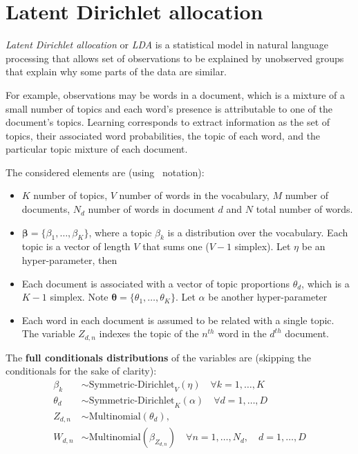 \section{Latent Dirichlet allocation}

\emph{Latent Dirichlet allocation} or \emph{LDA} is a statistical model in natural language processing that allows set of observations to be explained by unobserved groups that explain why some parts of the data are similar.

For example, observations may be words in a document, which is a mixture of a small number of topics and each word's presence is attributable to one of the document's topics. Learning corresponds to extract information as the set of topics, their associated word probabilities, the topic of each word, and the particular topic mixture of each document.

The considered elements are (using~\cite{hoffman2013stochastic} notation):
\begin{itemize}\setlength\itemsep{1em}
  \item \(K\) number of topics, \(V\) number of words in the vocabulary, \(M\) number of documents, \(N_{d}\) number of words in document \(d\) and \(N\) total number of words.
  \item \(\bm{\beta} = \{\beta_{1}, \dots, \beta_{K}\}\), where a topic \(\beta_{k}\) is a distribution over the vocabulary. Each topic is a vector of length \(V\) that sums one (\(V-1\) simplex). Let \(\eta\) be an hyper-parameter, then

  \item Each document is associated with a vector of topic proportions \(\theta_{d}\), which is a \(K-1\) simplex. Note \(\bm{\theta} = \{\theta_{1},\dots,\theta_{K}\}\).  Let \(\alpha\) be another hyper-parameter
  \item Each word in each document is assumed to be related with a single topic. The variable \(Z_{d,n}\) indexes the topic of the \(n^{th}\) word in the \(d^{th}\) document.
\end{itemize}

The \textbf{full conditionals distributions} of the variables are (skipping the conditionals for the sake of clarity):
    \[
    \begin{aligned}
      \beta_{k} &\sim \text{Symmetric-Dirichlet}_{V}(\eta) \quad \forall k=1,\dots,K \\[5pt]
      \theta_{d} &\sim \text{Symmetric-Dirichlet}_{K}(\alpha) \quad \forall d=1,\dots,D\\[5pt]
      Z_{d,n} &\sim \text{Multinomial}(\theta_{d}),\\[5pt]
      W_{d,n}  &\sim \text{Multinomial}(\beta_{Z_{d,n}}) \quad \forall n=1,\dots,N_{d}, \quad d=1,\dots,D
    \end{aligned}
    \]

